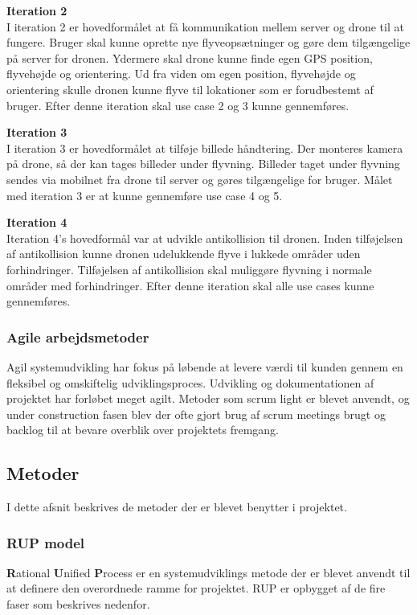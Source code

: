 \textbf{Iteration 2}\\
I iteration 2 er hovedformålet at få kommunikation mellem server og drone til at fungere. Bruger skal kunne oprette nye flyveopsætninger og gøre dem tilgængelige på server for dronen. Ydermere skal drone kunne finde egen GPS position, flyvehøjde og orientering. Ud fra viden om egen position, flyvehøjde og orientering skulle dronen kunne flyve til lokationer som er forudbestemt af bruger. Efter denne iteration skal use case 2 og 3 kunne gennemføres.

\textbf{Iteration 3}\\
I iteration 3 er hovedformålet at tilføje billede håndtering. Der monteres kamera på drone, så der kan tages billeder under flyvning. Billeder taget under flyvning sendes via mobilnet fra drone til server og gøres tilgængelige for bruger. Målet med iteration 3 er at kunne gennemføre use case 4 og 5.

\textbf{Iteration 4}\\
Iteration 4's hovedformål var at udvikle antikollision til dronen. Inden tilføjelsen af antikollision kunne dronen udelukkende flyve i lukkede områder uden forhindringer. Tilføjelsen af antikollision skal muliggøre flyvning i normale områder med forhindringer. Efter denne iteration skal alle use cases kunne gennemføres.


\subsubsection{Agile arbejdsmetoder}
Agil systemudvikling har fokus på løbende at levere værdi til kunden gennem en fleksibel og omskiftelig udviklingsproces. Udvikling og dokumentationen af projektet har forløbet meget agilt. Metoder som scrum light er blevet anvendt, og under construction fasen blev der ofte gjort brug af scrum meetings brugt og backlog til at bevare overblik over projektets fremgang.


\newpage
\subsection{Metoder}
I dette afsnit beskrives de metoder der er blevet benytter i projektet.

\subsubsection{RUP model}
\textbf{R}ational \textbf{U}nified \textbf{P}rocess er en systemudviklings metode der er blevet anvendt til at definere den overordnede ramme for projektet. RUP er opbygget af de fire faser som beskrives nedenfor.  

